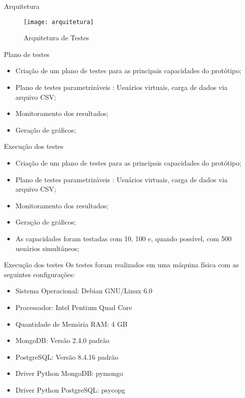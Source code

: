 \begin{frame}{Arquitetura}
	\begin{figure}[!htbp]
		\begin{center}
			\texttt{[image: arquitetura]}
		\end{center}
		\caption{Arquitetura de Testes}
		\label{fig:arquitetura}
	\end{figure}
\end{frame}

\begin{frame}{Plano de testes}
    \begin{itemize}
    \item Criação de um plano de testes para as principais capacidades do protótipo;
    \item Plano de testes parametrizáveis : Usuários virtuais, carga de dados via arquivo CSV;
    \item Monitoramento dos resultados;
    \item Geração de gráficos;
    \end{itemize}
\end{frame}

\begin{frame}{Execução dos testes}
    \begin{itemize}
    \item Criação de um plano de testes para as principais capacidades do protótipo;
    \item Plano de testes parametrizáveis : Usuários virtuais, carga de dados via arquivo CSV;
    \item Monitoramento dos resultados;
    \item Geração de gráficos;
    \item As capacidades foram testadas com 10, 100 e, quando possível, com 500 usuários simultâneos;
    \end{itemize}
\end{frame}

\begin{frame}{Execução dos testes}
Os testes foram realizados em uma máquina física com as seguintes configurações:

\begin{itemize}
\item Sistema Operacional: Debian GNU/Linux 6.0
\item Processador: Intel Pentium Quad Core
\item Quantidade de Memória RAM: 4 GB
\item MongoDB: Versão 2.4.0 padrão
\item PostgreSQL: Versão 8.4.16 padrão
\item Driver Python MongoDB: pymongo
\item Driver Python PostgreSQL: psycopg
\end{itemize}
\end{frame}

